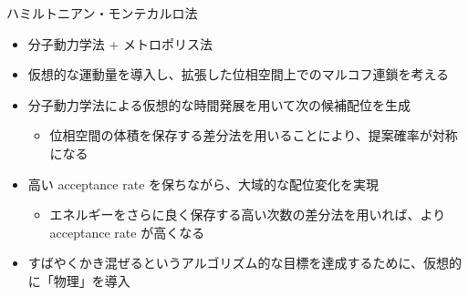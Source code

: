 
\begin{frame}[t,fragile]{ハミルトニアン・モンテカルロ法}
  \begin{itemize}
    \item 分子動力学法 + メトロポリス法
    \item 仮想的な運動量を導入し、拡張した位相空間上でのマルコフ連鎖を考える
    \item 分子動力学法による仮想的な時間発展を用いて次の候補配位を生成
    \begin{itemize}
      \item 位相空間の体積を保存する差分法を用いることにより、提案確率が対称になる
    \end{itemize}
    \item 高い acceptance rate を保ちながら、大域的な配位変化を実現
    \begin{itemize}
      \item エネルギーをさらに良く保存する高い次数の差分法を用いれば、より acceptance rate が高くなる
    \end{itemize}
    \item すばやくかき混ぜるというアルゴリズム的な目標を達成するために、仮想的に「物理」を導入
\end{itemize}
\end{frame}
